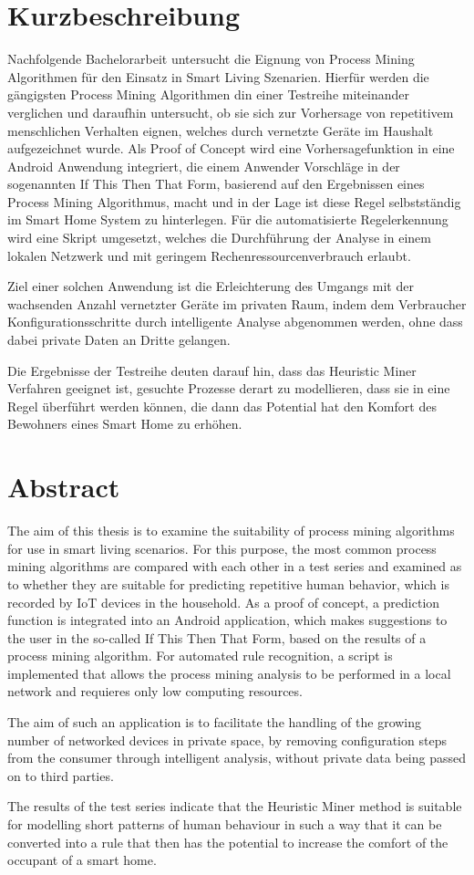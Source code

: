\chapter*{Kurzbeschreibung}\vspace{17mm}
Nachfolgende Bachelorarbeit untersucht die Eignung von Process Mining Algorithmen für den Einsatz in Smart Living Szenarien. Hierfür werden die gängigsten Process Mining Algorithmen din einer Testreihe miteinander verglichen und daraufhin untersucht, ob sie sich zur Vorhersage von repetitivem menschlichen Verhalten eignen, welches durch vernetzte Geräte im Haushalt aufgezeichnet wurde. Als Proof of Concept wird eine Vorhersagefunktion in eine Android Anwendung integriert, die einem Anwender Vorschläge in der sogenannten If This Then That Form, basierend auf den Ergebnissen eines Process Mining Algorithmus, macht und in der Lage ist diese Regel selbstständig im Smart Home System zu hinterlegen. Für die automatisierte Regelerkennung wird eine Skript umgesetzt, welches die Durchführung der Analyse in einem lokalen Netzwerk und mit geringem Rechenressourcenverbrauch erlaubt. 

Ziel einer solchen Anwendung ist die Erleichterung des Umgangs mit der wachsenden Anzahl vernetzter Geräte im privaten Raum, indem dem Verbraucher Konfigurationsschritte durch intelligente Analyse abgenommen werden, ohne dass dabei private Daten an Dritte gelangen. 

Die Ergebnisse der Testreihe deuten darauf hin, dass das Heuristic Miner Verfahren geeignet ist, gesuchte Prozesse derart zu modellieren, dass sie in eine Regel überführt werden können, die dann das Potential hat den Komfort des Bewohners eines Smart Home zu erhöhen.
\newpage
\chapter*{Abstract}\vspace{17mm}
The aim of this thesis is to examine the suitability of process mining algorithms for use in smart living scenarios. For this purpose, the most common process mining algorithms are compared with each other in a test series and examined as to whether they are suitable for predicting repetitive human behavior, which is  recorded by IoT devices in the household. As a proof of concept, a prediction function is integrated into an Android application, which makes suggestions to the user in the so-called If This Then That Form, based on the results of a process mining algorithm. 
For automated rule recognition, a script is implemented that allows the process mining analysis to be performed in a local network and requieres only low computing resources. 

The aim of such an application is to facilitate the handling of the growing number of networked devices in private space, by removing configuration steps from the consumer through intelligent analysis, without private data being passed on to third parties. 

The results of the test series indicate that the Heuristic Miner method is suitable for modelling short patterns of human behaviour in such a way that it can be converted into a rule that then has the potential to increase the comfort of the occupant of a smart home.
